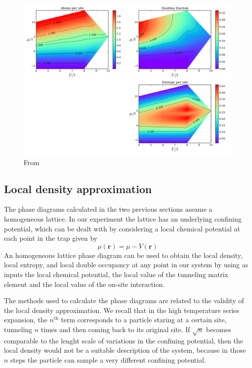 \documentclass[oneside,11pt]{memoir}
\newcommand{\bv}[1]{\ensuremath{\bm{#1}}}
\begin{document}
\begin{figure}
\centering \includegraphics[width=\textwidth]{../figures/HubbardPhaseDiagram_figures/FUCHS_phasesT=3.png}
\caption[Low temperature phase diagram of the Fermi-Hubbard model]{\small
From~\cite{Fuchs2011}} \label{fig:fuchs03}
\end{figure}


\subsection{ Local density approximation }



The phase diagrams calculated in the two previous sections assume a homogeneous
lattice.  In our experiment the lattice has an underlying confining potential,
which can be dealt with by considering a local chemical potential at each point
in the trap given by
\begin{equation}
 \mu(\bv{r}) = \mu - V(\bv{r}) 
\end{equation}
An homogeneous lattice phase diagram can be used to obtain the local density,
local entropy, and local double occupancy at any point in our system by using
as inputs the local chemical potential,  the local value of the tunneling
matrix element and the local value of the on-site interaction.  

The methods used to calculate the phase diagrams are related to the validity of
the local density approximation.   We recall that in the high temperature
series expansion, the $n^{\text{th}}$  term corresponds to a particle staring
at a certain site, tunneling $n$ times and then coming back to its original
site.  If $\sqrt{n}$ becomes comparable to the lenght scale of variations in
the confining potential, then the local density would not be a suitable
description of the system, because in those $n$ steps the particle can sample a
very different confining potential.  
\end{document}

